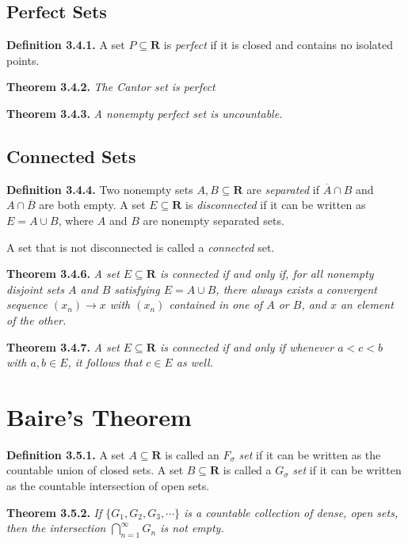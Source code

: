 \documentclass[12pt]{report}
\newcommand{\R}{\textbf{R}}
\newcommand{\close}[1]{\overline{#1}}
\begin{document}
\subsection*{Perfect Sets}

\noindent \textbf{Definition 3.4.1.}  A set $P\subseteq\R$ is \textit{perfect} if it is closed and contains no isolated points.
\bigskip

\noindent \textbf{Theorem 3.4.2.} \textit{The Cantor set is perfect}
\bigskip

\noindent \textbf{Theorem 3.4.3.} \textit{A nonempty perfect set is uncountable.}
\bigskip

\subsection*{Connected Sets}

\noindent \textbf{Definition 3.4.4.}  Two nonempty sets $A,B\subseteq\R$ are \textit{separated} if $\close{A}\cap B$ and $A\cap\close{B}$ are both empty.  A set $E\subseteq\R$ is \textit{disconnected} if it can be written as $E=A\cup B$, where $A$ and $B$ are nonempty separated sets.

A set that is not disconnected is called a \textit{connected} set.
\bigskip

\noindent \textbf{Theorem 3.4.6.}  \textit{A set $E\subseteq\R$ is connected if and only if, for all nonempty disjoint sets $A$ and $B$ satisfying $E=A\cup B$, there always exists a convergent sequence $(x_n)\rightarrow x$ with $(x_n)$ contained in one of $A$ or $B$, and $x$ an element of the other.}
\bigskip

\noindent \textbf{Theorem 3.4.7.} \textit{A set $E\subseteq\R$ is connected if and only if whenever $a<c<b$ with $a,b\in E$, it follows that $c\in E$ as well.}
\bigskip

\section{Baire's Theorem}

\noindent \textbf{Definition 3.5.1.}  A set $A\subseteq\R$ is called an $F_\sigma$ \textit{set} if it can be written as the countable union of closed sets.  A set $B\subseteq\R$ is called a $G_\sigma$ \textit{set} if it can be written as the countable intersection of open sets.
\bigskip

\noindent \textbf{Theorem 3.5.2.} \textit{If $\{G_1,G_2,G_3,\cdots\}$ is a countable collection of dense, open sets, then the intersection $\bigcap_{n=1}^\infty G_n$ is not empty.}
\bigskip
\end{document}
